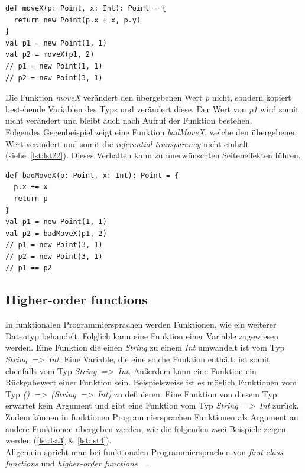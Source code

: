\begin{lstlisting}[caption={Beispiel einer Funktion mit \textit{referential transparency}.},label={lst:lst2}]
def moveX(p: Point, x: Int): Point = {
  return new Point(p.x + x, p.y)
}
val p1 = new Point(1, 1)
val p2 = moveX(p1, 2)
// p1 = new Point(1, 1)
// p2 = new Point(3, 1)
\end{lstlisting}

Die Funktion \textit{moveX} verändert den übergebenen Wert \textit{p} nicht, sondern kopiert bestehende Variablen des Typs und verändert diese. Der Wert von \textit{p1} wird somit nicht verändert und bleibt auch nach Aufruf der Funktion bestehen.\\
Folgendes Gegenbeispiel zeigt eine Funktion \textit{badMoveX}, welche den übergebenen Wert verändert und somit die \textit{referential transparency} nicht einhält (siehe~\autoref{lst:lst22}). Dieses Verhalten kann zu unerwünschten Seiteneffekten führen.

\begin{lstlisting}[caption={Beispiel einer Funktion ohne \textit{referential transparency}.},label={lst:lst22}]
def badMoveX(p: Point, x: Int): Point = {
  p.x += x
  return p
}
val p1 = new Point(1, 1)
val p2 = badMoveX(p1, 2)
// p1 = new Point(3, 1)
// p2 = new Point(3, 1)
// p1 == p2
\end{lstlisting}

\pagebreak

\subsection{Higher-order functions}
In funktionalen Programmiersprachen werden Funktionen, wie ein weiterer Datentyp behandelt. Folglich kann eine Funktion einer Variable zugewiesen werden. Eine Funktion die einen \textit{String} zu einem \textit{Int} umwandelt ist vom Typ \textit{String~=>~Int}. Eine Variable, die eine solche Funktion enthält, ist somit ebenfalls vom Typ \textit{String~=>~Int}. Außerdem kann eine Funktion ein Rückgabewert einer Funktion sein. Beispielsweise ist es möglich Funktionen vom Typ \textit{()~=>~(String~=>~Int)} zu definieren. Eine Funktion von diesem Typ erwartet kein Argument und gibt eine Funktion vom Typ \textit{String~=>~Int} zurück. Zudem können in funktionen Programmiersprachen Funktionen als Argument an andere Funktionen übergeben werden, wie die folgenden zwei Beispiele zeigen werden (\ref{lst:lst3} \& \ref{lst:lst4}).\\
Allgemein spricht man bei funktionalen Programmiersprachen von \textit{first-class functions} und \textit{higher-order functions}~\cite[S.~50]{butcher_seven_2014}~\cite[S.~3~\&~S.~19]{chiusano_functional_2015}.\\

